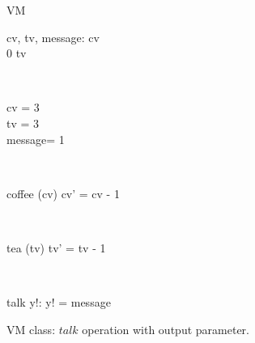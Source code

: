 \begin{figure}[H]
\centering
\begin{class}{VM}
\\
\begin{state}
cv, tv, message: \integer
{} \leq  cv 
\\
0 \leq  tv 
\end{state} 
\\
\begin{init}
cv = 3
\\tv = 3
\\ message= 1
\end{init} 
\\
\begin{op}{coffee}
\Delta (cv)
\ST
cv' = cv - 1
\end{op}
\\
\begin{op}{tea}
\Delta (tv)
\ST
tv' = tv - 1
\end{op}
\\
\begin{op}{talk}
y!: \integer
\ST
y! = message
\end{op}
\end{class}
\caption{VM class: $talk$ operation with output parameter.}
\label{oz_vm_with_operation_input_output_parameters}
\end{figure}
